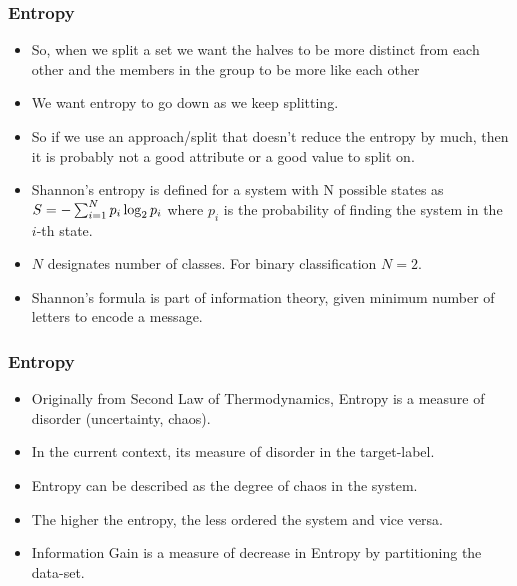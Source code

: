 \begin{frame}[fragile]\frametitle{Entropy}
\begin{itemize}
\item So, when we split a set we want the halves to be more distinct from each other and the members in the group to be more like each other
\item We want entropy to go down as we keep splitting.
\item So if we use an approach/split that doesn't reduce the entropy by much, then it is probably not a good attribute or a good value to split on.
\item Shannon's entropy is defined for a system with N possible states as 
$\Large S = -\sum_{i=1}^{N}p_i \log_2{p_i}$  where $p_i$  is the probability of finding the system in the  $i$-th state.
\item $N$ designates number of classes. For binary classification $N=2$.
\item Shannon's formula is part of information theory, given minimum number of letters to encode a message.
\end{itemize}
\end{frame}

\begin{frame}[fragile]\frametitle{Entropy}
\begin{itemize}
\item Originally from Second Law of Thermodynamics, Entropy is a measure of disorder (uncertainty, chaos).
\item In the current context, its measure of disorder in the target-label.
\item  Entropy can be described as the degree of chaos in the system.
\item The higher the entropy, the less ordered the system and vice versa.
\item Information Gain is a measure of decrease in Entropy by partitioning the data-set.
\end{itemize}
\end{frame}




